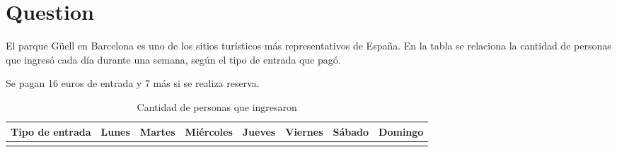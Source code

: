 \documentclass[
]{article}
\author{}
\date{\vspace{-2.5em}}
\begin{document}
\section{Question}\label{question}

El parque Güell en Barcelona es uno de los sitios turísticos más
representativos de España. En la tabla se relaciona la cantidad de
personas que ingresó cada día durante una semana, según el tipo de
entrada que pagó.

Se pagan 16 euros de entrada y 7 más si se realiza reserva.

\begin{longtable}[]{@{}
  >{\raggedright\arraybackslash}p{}
  >{\centering\arraybackslash}p{}
  >{\centering\arraybackslash}p{}
  >{\centering\arraybackslash}p{}
  >{\centering\arraybackslash}p{}
  >{\centering\arraybackslash}p{}
  >{\centering\arraybackslash}p{}
  >{\centering\arraybackslash}p{}@{}}
\caption{Cantidad de personas que ingresaron}\tabularnewline
\toprule\noalign{}
\begin{minipage}[b]{\linewidth}\raggedright
Tipo de entrada
\end{minipage} & \begin{minipage}[b]{\linewidth}\centering
Lunes
\end{minipage} & \begin{minipage}[b]{\linewidth}\centering
Martes
\end{minipage} & \begin{minipage}[b]{\linewidth}\centering
Miércoles
\end{minipage} & \begin{minipage}[b]{\linewidth}\centering
Jueves
\end{minipage} & \begin{minipage}[b]{\linewidth}\centering
Viernes
\end{minipage} & \begin{minipage}[b]{\linewidth}\centering
Sábado
\end{minipage} & \begin{minipage}[b]{\linewidth}\centering
Domingo
\end{minipage} \\
\midrule\noalign{}

\end{longtable}
\end{document}
